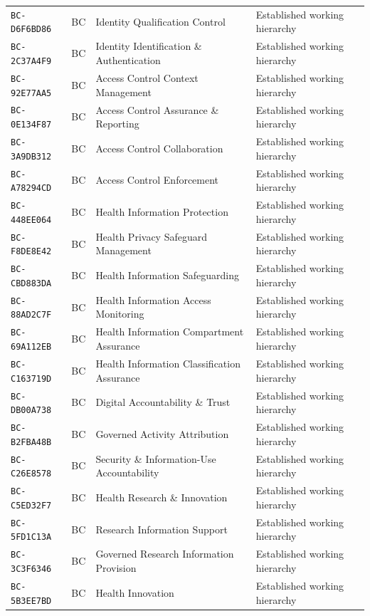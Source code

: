 \documentclass[11pt,a4paper,openany]{book}
\begin{document}
\begin{longtable}{@{}p{.19\linewidth}p{.12\linewidth}p{.39\linewidth}p{.24\linewidth}@{}}
\texttt{BC-D6F6BD86} & BC & Identity Qualification Control & Established working hierarchy \\
\texttt{BC-2C37A4F9} & BC & Identity Identification \& Authentication & Established working hierarchy \\
\texttt{BC-92E77AA5} & BC & Access Control Context Management & Established working hierarchy \\
\texttt{BC-0E134F87} & BC & Access Control Assurance \& Reporting & Established working hierarchy \\
\texttt{BC-3A9DB312} & BC & Access Control Collaboration & Established working hierarchy \\
\texttt{BC-A78294CD} & BC & Access Control Enforcement & Established working hierarchy \\
\texttt{BC-448EE064} & BC & Health Information Protection & Established working hierarchy \\
\texttt{BC-F8DE8E42} & BC & Health Privacy Safeguard Management & Established working hierarchy \\
\texttt{BC-CBD883DA} & BC & Health Information Safeguarding & Established working hierarchy \\
\texttt{BC-88AD2C7F} & BC & Health Information Access Monitoring & Established working hierarchy \\
\texttt{BC-69A112EB} & BC & Health Information Compartment Assurance & Established working hierarchy \\
\texttt{BC-C163719D} & BC & Health Information Classification Assurance & Established working hierarchy \\
\texttt{BC-DB00A738} & BC & Digital Accountability \& Trust & Established working hierarchy \\
\texttt{BC-B2FBA48B} & BC & Governed Activity Attribution & Established working hierarchy \\
\texttt{BC-C26E8578} & BC & Security \& Information-Use Accountability & Established working hierarchy \\
\texttt{BC-C5ED32F7} & BC & Health Research \& Innovation & Established working hierarchy \\
\texttt{BC-5FD1C13A} & BC & Research Information Support & Established working hierarchy \\
\texttt{BC-3C3F6346} & BC & Governed Research Information Provision & Established working hierarchy \\
\texttt{BC-5B3EE7BD} & BC & Health Innovation & Established working hierarchy \\

\end{longtable}
\end{document}
